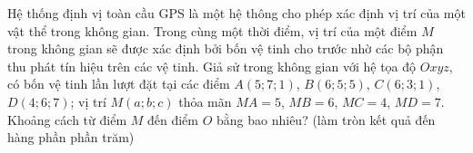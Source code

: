 \begin{bt}%
	Hệ thống định vị toàn cầu GPS là một hệ thông cho phép xác định vị trí của một vật thể trong không gian. Trong cùng một thời điểm, vị trí của một điểm $M$ trong không gian sẽ được xác định bởi bốn vệ tinh cho trước nhờ các bộ phận thu phát tín hiệu trên các vệ tinh. Giả sử trong không gian với hệ tọa độ $Oxyz$, có bốn vệ tinh lần lượt đặt tại các điểm $A(5; 7; 1)$, $B(6; 5; 5)$, $C(6; 3; 1)$, $D(4; 6; 7)$; vị trí $M(a; b; c)$ thỏa mãn $MA=5$, $MB=6$, $MC=4$, $MD=7$. Khoảng cách từ điểm $M$ đến điểm $O$ bằng bao nhiêu? (làm tròn kết quả đến hàng phần phần trăm)
\end{bt}

